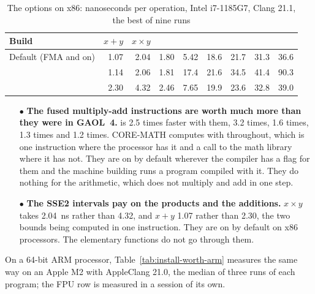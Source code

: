 \documentclass[12pt,a4paper,twoside,openright]{book}
\begin{document}
\begin{table}[htbp]
  \centering\renewcommand{\arraystretch}{1.1}\footnotesize
  \setlength{\tabcolsep}{4pt}
  \begin{tabular}{L{3.3cm}rrrrrrrr}
    \hline
    Build & $x + y$ & $x \times y$ &  &  &
     &  &  & \\
    \hline\hline
    Default (FMA and  on) & 1.07 & 2.04 & 1.80 & 5.42 &
    18.6 & 21.7 & 31.3 & 36.6\\
     & 1.14 & 2.06 & 1.81 & 17.4 & 21.6 & 34.5 &
    41.4 & 90.3\\
     & 2.30 & 4.32 & 2.46 & 7.65 & 19.9 & 23.6 &
    32.8 & 39.0\\
    \hline
  \end{tabular}
  \caption{The options on x86: nanoseconds per operation, Intel i7-1185G7,
    Clang 21.1, the best of nine runs}
  \label{tab:install-worth-x86}
\end{table}

\begin{itemize}
\item[$\bullet$] \textbf{The fused multiply-add instructions are worth much
  more than they were in GAOL~4.}  is 2.5 times faster with them,
   3.2 times,  1.6 times,  1.3 times and
   1.2 times. CORE-MATH computes with 
  throughout, which is one instruction where the processor has it and a call
  to the math library where it has not. They are on by default wherever the
  compiler has a flag for them and the machine building runs a program
  compiled with it. They do nothing for the arithmetic, which does not
  multiply and add in one step.\newinvfive
\item[$\bullet$] \textbf{The SSE2 intervals pay on the products and the
  additions.} $x \times y$ takes 2.04~ns rather than 4.32, and $x + y$ 1.07
  rather than 2.30, the two bounds being computed in one instruction. They
  are on by default on x86 processors. The elementary functions do not go
  through them.
\end{itemize}

\medskip
On a 64-bit ARM processor, Table~\ref{tab:install-worth-arm} measures the
same way on an Apple M2 with AppleClang 21.0, the median of three runs of
each program; the FPU row is measured in a session of its own.
\end{document}
